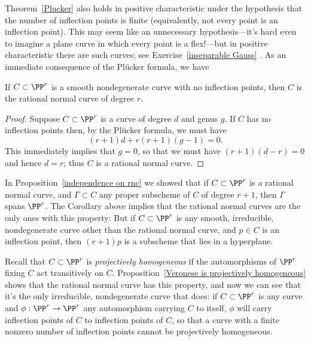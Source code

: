 Theorem~\ref{Plucker} also holds in positive characteristic under the hypothesis that the number of inflection points is finite (equivalently, not every point is an inflection point). This may seem like an unnecessary hypothesis---it's hard even to imagine a plane curve in which every point is a flex!---but in positive characteristic there are such curves; see Exercise~\ref{inseparable Gauss} .
As an immediate consequence of the Pl\"ucker formula, we have

\begin{corollary}\label{uninflected curves}
 If $C\subset \PP^r$ is a smooth nondegenerate curve with no inflection points, then $C$ is the rational normal curve of degree $r$. 
\end{corollary}

\begin{proof}
Suppose $C \subset \PP^r$ is a curve of degree $d$ and genus $g$. If $C$ has no inflection points then, by the Pl\"ucker formula, we must have
$$
(r+1)d + r(r+1)(g-1) = 0.
$$
This immediately implies that $g=0$, so that we must have $(r+1)(d-r) = 0$ and hence $d=r$; thus $C$ is a rational normal curve.
\end{proof}

In Proposition~\ref{independence on rnc} we showed that if $C \subset \PP^r$ is a rational normal curve, and $\Gamma \subset C$ any proper subscheme of $C$ of degree $r+1$, then $\Gamma$ spans $\PP^r$. The Corollary above implies that the
rational normal curves are the only ones with this property:
But if $C \subset \PP^r$ is any smooth, irreducible, nondegenerate curve other than the rational normal curve,
 and $p \in C$ is an inflection point, then $(r+1)p$ is  a subscheme that lies in a hyperplane. 

Recall that $C\subset \PP^r$ is \emph{projectively homogeneous} if the automorphisms of $\PP^r$ fixing
$C$ act transitively on $C$.  Proposition~\ref{Veronese is projectively homogeneous} shows that the rational normal curve has this property, and now we can see that it's the only irreducible, nondegenerate curve that does: if $C \subset \PP^r$ is any curve and $\phi : \PP^r \to \PP^r$ any automorphism carrying $C$ to itself, $\phi$ will carry inflection points of $C$ to inflection points of $C$, so that a curve with a finite nonzero number of inflection points cannot be projectively homogeneous.

